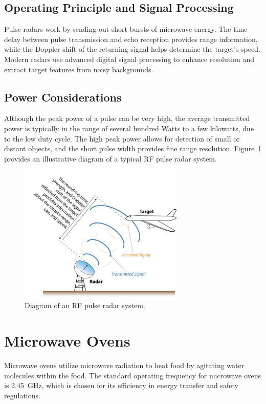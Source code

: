 \documentclass{article}
\begin{document}
\subsection*{Operating Principle and Signal Processing}
Pulse radars work by sending out short bursts of microwave energy. The time delay between pulse transmission and echo reception provides range information, while the Doppler shift of the returning signal helps determine the target's speed. Modern radars use advanced digital signal processing to enhance resolution and extract target features from noisy backgrounds.

\subsection*{Power Considerations}
Although the peak power of a pulse can be very high, the average transmitted power is typically in the range of several hundred Watts to a few kilowatts, due to the low duty cycle. The high peak power allows for detection of small or distant objects, and the short pulse width provides fine range resolution. Figure~\ref{fig:pulse_radar} provides an illustrative diagram of a typical RF pulse radar system.

\begin{figure}[H]
    \centering
    \includegraphics[width=0.7\textwidth]{pulse_radar_diagram.jpg}
    \caption{Diagram of an RF pulse radar system.}
    \label{fig:pulse_radar}
\end{figure}

\section{Microwave Ovens}
Microwave ovens utilize microwave radiation to heat food by agitating water molecules within the food. The standard operating frequency for microwave ovens is 2.45~GHz, which is chosen for its efficiency in energy transfer and safety regulations.
\end{document}
